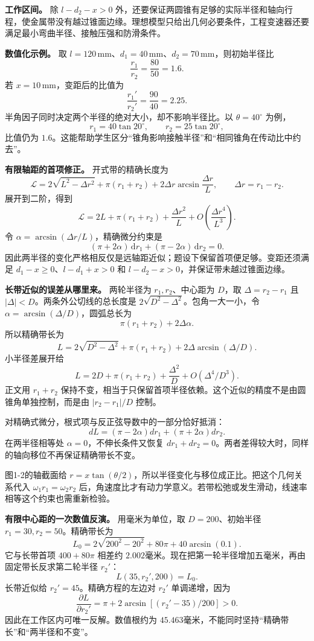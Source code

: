 \documentclass[12pt,a4paper,UTF8]{ctexart}
\begin{document}
\textbf{工作区间。} 除 \(l-d_2-x>0\)
外，还要保证两圆锥有足够的实际半径和轴向行程，使金属带没有越过锥面边缘。理想模型只给出几何必要条件，工程变速器还要满足最小弯曲半径、接触压强和防滑条件。

\textbf{数值化示例。} 取
\(l=120\,\mathrm{mm}\)、\(d_1=40\,\mathrm{mm}\)、\(d_2=70\,\mathrm{mm}\)，则初始半径比
\[
\frac{r_1}{r_2}=\frac{80}{50}=1.6.
\] 若 \(x=10\,\mathrm{mm}\)，变距后的比值为 \[
\frac{r_1'}{r_2'}=\frac{90}{40}=2.25.
\] 半角因子同时决定两个半径的绝对大小，却不影响半径比。以
\(\theta=40^\circ\) 为例， \[
r_1=40\tan20^\circ,\qquad r_2=25\tan20^\circ,
\] 比值仍为
\(1.6\)。这能帮助学生区分``锥角影响接触半径''和``相同锥角在传动比中约去''。

\textbf{有限轴距的首项修正。} 开式带的精确长度为 \[
\mathcal L=2\sqrt{L^2-\Delta r^2}+\pi(r_1+r_2)
+2\Delta r\arcsin\frac{\Delta r}{L},\qquad \Delta r=r_1-r_2.
\] 展开到二阶，得到 \[
\mathcal L=2L+\pi(r_1+r_2)+\frac{\Delta r^2}{L}
+O\left(\frac{\Delta r^4}{L^3}\right).
\] 令 \(\alpha=\arcsin(\Delta r/L)\)，精确微分约束是 \[
(\pi+2\alpha)\,\mathrm dr_1+(\pi-2\alpha)\,\mathrm dr_2=0.
\]
因此两半径的变化严格相反仅是远轴距近似；题设下保留首项便足够。变距还须满足
\(d_1-x\ge0\)、\(l-d_1+x>0\) 和 \(l-d_2-x>0\)，并保证带未越过锥面边缘。

\textbf{长带近似的误差从哪里来。} 两轮半径为 \(r_1,r_2\)、中心距为
\(D\)，取 \(\Delta=r_2-r_1\) 且 \(|\Delta|<D\)。两条外公切线的总长度是
\(2\sqrt{D^2-\Delta^2}\)。包角一大一小，令
\(\alpha=\arcsin(\Delta/D)\)，圆弧总长为 \[
\pi(r_1+r_2)+2\Delta\alpha.
\] 所以精确带长为 \[
L=2\sqrt{D^2-\Delta^2}+\pi(r_1+r_2)+2\Delta\arcsin(\Delta/D).
\] 小半径差展开给 \[
L=2D+\pi(r_1+r_2)+\frac{\Delta^2}{D}+O(\Delta^4/D^3).
\] 正文用 \(r_1+r_2\)
保持不变，相当于只保留首项半径依赖。这个近似的精度不是由圆锥角单独控制，而是由
\(|r_2-r_1|/D\) 控制。

对精确式微分，根式项与反正弦导数中的一部分恰好抵消： \[
dL=(\pi-2\alpha)dr_1+(\pi+2\alpha)dr_2.
\] 在两半径相等处 \(\alpha=0\)，不伸长条件又恢复
\(dr_1+dr_2=0\)。两者差得较大时，同样的轴向移位不再保证精确带长不变。

图1-2的轴截面给
\(r=x\tan(\theta/2)\)，所以半径变化与移位成正比。把这个几何关系代入
\(\omega_1r_1=\omega_2r_2\)
后，角速度比才有动力学意义。若带松弛或发生滑动，线速率相等这个约束也需重新检验。

\textbf{有限中心距的一次数值反演。} 用毫米为单位，取 \(D=200\)、初始半径
\(r_1=30,r_2=50\)。精确带长为 \[
L_0=2\sqrt{200^2-20^2}+80\pi+40\arcsin(0.1).
\] 它与长带首项 \(400+80\pi\) 相差约
\(2.002\)毫米。现在把第一轮半径增加五毫米，再由固定带长反求第二轮半径
\(r_2'\)： \[
L(35,r_2',200)=L_0.
\] 长带近似给 \(r_2'=45\)。精确方程的左边对 \(r_2'\) 单调递增，因为 \[
\frac{\partial L}{\partial r_2'}=\pi+2\arcsin[(r_2'-35)/200]>0.
\] 因此在工作区内可唯一反解。数值根约为
\(45.463\)毫米，不能同时坚持``精确带长''和``两半径和不变''。
\end{document}
